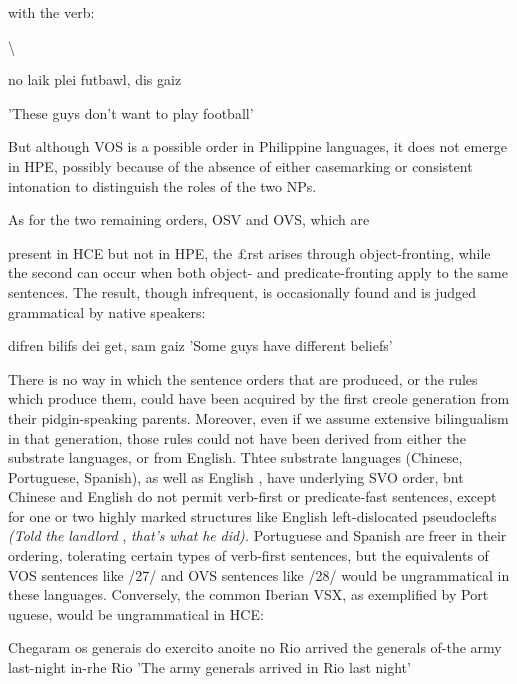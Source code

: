 with the verb:

{\textbackslash}


\ea\label{ex:27}
no laik plei futbawl, dis gaiz
\glt
\z

'These guys don't want to play football'

But although VOS is a possible order in Philippine languages, it does not emerge in HPE, possibly because of the absence of either case\-marking or consistent intonation to distinguish the roles of the two NPs.

As for the two remaining orders, OSV and OVS, which are

present in HCE but not in HPE, the £rst arises through object-fronting, while the second can occur when both object- and predicate-fronting apply to the same sentences. The result, though infrequent, is occasion\-ally found and is judged grammatical by native speakers:

\ea\label{ex:28}
difren bilifs dei get, sam gaiz 'Some guys have different beliefs'
\glt
\z

There is no way in which the sentence orders that are produced, or the rules which produce them, could have been acquired by the first creole generation from their pidgin-speaking parents. Moreover, even if we assume extensive bilingualism in that generation, those rules could not have been derived from either the substrate languages, or from English. Thtee substrate languages (Chinese, Portuguese, Spanish), as well as English , have underlying SVO order, bnt Chinese and English do not permit verb-first or predicate-fast sentences, except for one or two highly marked structures like English left-dislocated pseudo\-clefts \textit{(Told} \textit{the} \textit{landlord} , \textit{that's} \textit{what} \textit{he} \textit{did)}\textit{.} Portuguese and Spanish are freer in their ordering, tolerating certain types of verb-first sen\-tences, but the equivalents of VOS sentences like /27/ and OVS sen\-tences like /28/ would be ungrammatical in these languages. Conversely, the common Iberian VSX, as exemplified by Port uguese, would be ungrammatical in HCE:

\ea\label{ex:29}
Chegaram os generais do exercito anoite no Rio arrived the generals of-the army last-night in-rhe Rio 'The army generals arrived in Rio last night'
\glt
\z


